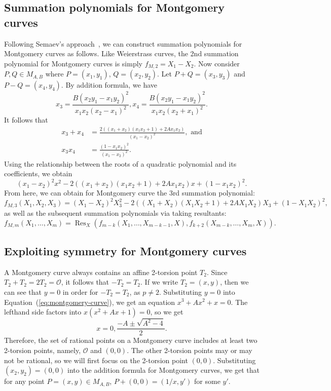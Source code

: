 \documentclass{llncs}
\DeclareMathOperator{\res}{Res}
\begin{document}
\subsection{Summation polynomials for Montgomery curves}

Following Semaev's approach~\cite{DBLP:journals/iacr/Semaev04}, we can
construct summation polynomials for Montgomery curves as follows.
%
Like Weierstrass curves, the 2nd summation polynomial for Montgomery
curves is simply $f_{M,2} = X_1 - X_2$.
%
Now consider $P,Q\in M_{A, B}$ where $P=(x_1, y_1)$, $Q=(x_2, y_2)$.
%
Let $P+Q=(x_3, y_3)$ and $P-Q=(x_4, y_4)$.
%
By addition formula, we have
\[ x_3 = \frac{B(x_2y_1 - x_1y_2)^2} {x_1x_2(x_2 - x_1)^2},
  x_4 =\frac{B(x_2y_1 - x_1y_2)^2} {x_1x_2(x_2 + x_1)^2}. \]
%
It follows that
%
\begin{align*}
  x_3 + x_4&=\frac{2\left((x_1 + x_2)(x_1x_2 + 1) + 2Ax_1x_2\right)}{(x_1 - x_2)^2},\text{ and} \\
  x_3x_4&=\frac{(1 - x_1x_2)^2}{(x_1 - x_2)^2}.
\end{align*}
%
Using the relationship between the roots of a quadratic polynomial and
its coefficients, we obtain
\[ (x_1 - x_2)^2x^2 - 2\left((x_1 + x_2)(x_1x_2 + 1) +
    2Ax_1x_2\right)x + (1 - x_1x_2)^2. \]
%
From here, we can obtain for Montgomery curve the 3rd summation
polynomial:
\[ f_{M,3}(X_1,X_2,X_3) = (X_1 - X_2)^2X_3^2 - 2\left((X_1 +
    X_2)(X_1X_2 + 1) + 2AX_1X_2\right)X_3 + (1-X_1X_2)^2, \]
%
as well as the subsequent summation polynomials via taking resultants:
\[ f_{M,m}(X_1,\ldots,X_m) =
  \res_X\left(f_{m-k}(X_1,\ldots,X_{m-k-1},X),f_{k+2}(X_{m-k},\ldots,X_m,X)\right). \]
\subsection{Exploiting symmetry for Montgomery curves} \label{subsec:TSPL}
A Montgomery curve always contains an affine 2-torsion point $T_2$.
%
Since $T_2+T_2=2T_2=\mathcal O$, it follows that $-T_2=T_2$.
%
If we write $T_2=(x,y)$, then we can see that $y=0$ in order for
$-T_2=T_2$, as $p\neq 2$.
%
Substituting $y=0$ into Equation~(\ref{eq:montgomery-curve}),
we get an equation $x^3+Ax^2+x=0$.
%
The lefthand side factors into $x(x^2+Ax+1)=0$, so we get \[
  x=0,\frac{-A\pm\sqrt{A^2 - 4}}{2}. \]
%
Therefore, the set of rational points on a Montgomery curve includes
at least two 2-torsion points, namely, $\mathcal O$ and $(0,0)$.
%
The other 2-torsion points may or may not be rational, so we will
first focus on the 2-torsion point $(0,0)$.
%
Substituting $(x_2,y_2)=(0,0)$ into the addition formula for
Montgomery curves, we get that for any point $P=(x,y)\in M_{A,B}$,
$P+(0,0)=(1/x,y')$ for some $y'$.
\end{document}
